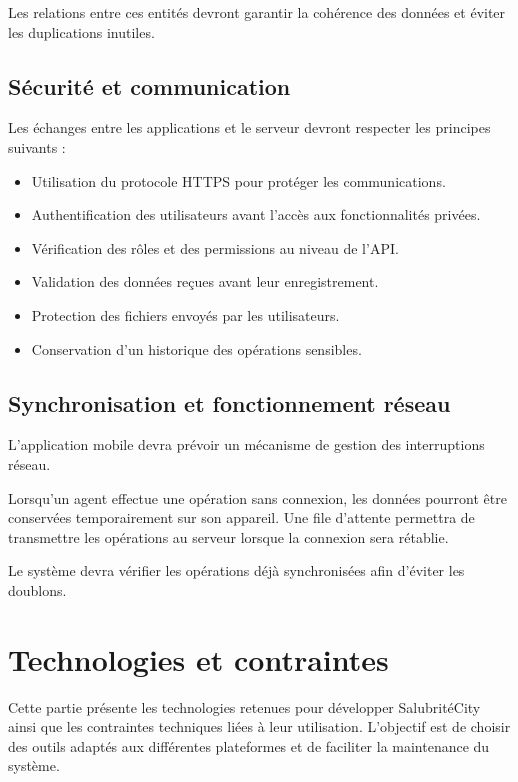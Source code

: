 \documentclass[11pt,a4paper,oneside]{report}
\begin{document}
	Les relations entre ces entités devront garantir la cohérence
	des données et éviter les duplications inutiles.
	
	\subsection{Sécurité et communication}
	
	Les échanges entre les applications et le serveur devront respecter
	les principes suivants :
	
	\begin{itemize}
		\item Utilisation du protocole HTTPS pour protéger les communications.
		\item Authentification des utilisateurs avant l'accès aux
		fonctionnalités privées.
		\item Vérification des rôles et des permissions au niveau de l'API.
		\item Validation des données reçues avant leur enregistrement.
		\item Protection des fichiers envoyés par les utilisateurs.
		\item Conservation d'un historique des opérations sensibles.
	\end{itemize}
	
	\subsection{Synchronisation et fonctionnement réseau}
	
	L'application mobile devra prévoir un mécanisme de gestion des
	interruptions réseau.
	
	Lorsqu'un agent effectue une opération sans connexion, les données
	pourront être conservées temporairement sur son appareil. Une file
	d'attente permettra de transmettre les opérations au serveur lorsque
	la connexion sera rétablie.
	
	Le système devra vérifier les opérations déjà synchronisées afin
	d'éviter les doublons.
	
	
	\section{Technologies et contraintes}
	
	Cette partie présente les technologies retenues pour développer
	SalubritéCity ainsi que les contraintes techniques liées à leur
	utilisation. L'objectif est de choisir des outils adaptés aux
	différentes plateformes et de faciliter la maintenance du système.
	
\end{document}
